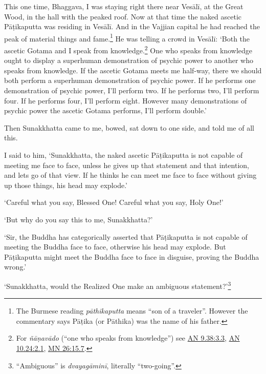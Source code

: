 \documentclass[12pt,openany]{book}%
\begin{document}
This one time, Bhaggava, I was staying right there near \textsanskrit{Vesālī}, at the Great Wood, in the hall with the peaked roof. Now at that time the naked ascetic \textsanskrit{Pāṭikaputta} was residing in \textsanskrit{Vesālī}. And in the Vajjian capital he had reached the peak of material things and fame.\footnote{The Burmese reading \textit{\textsanskrit{pāthikaputta}} means “son of a traveler”. However the commentary says \textsanskrit{Pāṭika} (or \textsanskrit{Pāthika}) was the name of his father. } He was telling a crowd in \textsanskrit{Vesālī}: ‘Both the ascetic Gotama and I speak from knowledge.\footnote{For \textit{\textsanskrit{ñāṇavādo}} (“one who speaks from knowledge”) see \href{https://suttacentral.net/an9.38/en/sujato\#3.3}{AN 9.38:3.3}, \href{https://suttacentral.net/an10.24/en/sujato\#2.1}{AN 10.24:2.1}, \href{https://suttacentral.net/mn26/en/sujato\#15.7}{MN 26:15.7}. } One who speaks from knowledge ought to display a superhuman demonstration of psychic power to another who speaks from knowledge. If the ascetic Gotama meets me half-way, there we should both perform a superhuman demonstration of psychic power. If he performs one demonstration of psychic power, I’ll perform two. If he performs two, I’ll perform four. If he performs four, I’ll perform eight. However many demonstrations of psychic power the ascetic Gotama performs, I’ll perform double.’ 

Then Sunakkhatta came to me, bowed, sat down to one side, and told me of all this. 

I said to him, ‘Sunakkhatta, the naked ascetic \textsanskrit{Pāṭikaputta} is not capable of meeting me face to face, unless he gives up that statement and that intention, and lets go of that view. If he thinks he can meet me face to face without giving up those things, his head may explode.’ 

‘Careful what you say, Blessed One! Careful what you say, Holy One!’ 

‘But why do you say this to me, Sunakkhatta?’ 

‘Sir, the Buddha has categorically asserted that \textsanskrit{Pāṭikaputta} is not capable of meeting the Buddha face to face, otherwise his head may explode. But \textsanskrit{Pāṭikaputta} might meet the Buddha face to face in disguise, proving the Buddha wrong.’ 

‘Sunakkhatta, would the Realized One make an ambiguous statement?’\footnote{“Ambiguous” is \textit{\textsanskrit{dvayagāminī}}, literally “two-going”. } 
\end{document}

